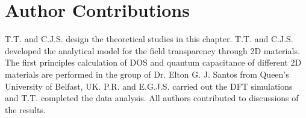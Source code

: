 \section{Author Contributions}
\label{sec:qc-author-contributions}
T.T. and C.J.S. design the theoretical studies in this
chapter. T.T. and C.J.S. developed the analytical model for the field
transparency through 2D materials. The first principles calculation of
DOS and quantum capacitance of different 2D materials are performed in
the group of Dr. Elton G. J. Santos from Queen's University of
Belfast, UK. P.R. and E.G.J.S. carried out the DFT simulations and
T.T. completed the data analysis. All authors contributed to
discussions of the results.

